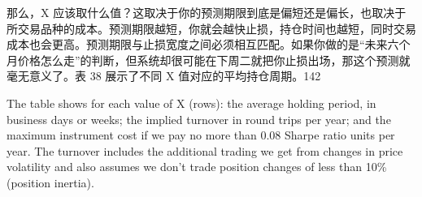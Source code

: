 \begin{chineseblock}那么，X 应该取什么值？这取决于你的预测期限到底是偏短还是偏长，也取决于所交易品种的成本。预测期限越短，你就会越快止损，持仓时间也越短，同时交易成本也会更高。预测期限与止损宽度之间必须相互匹配。如果你做的是“未来六个月价格怎么走”的判断，但系统却很可能在下周二就把你止损出场，那这个预测就毫无意义了。表 38 展示了不同 X 值对应的平均持仓周期。142 \end{chineseblock}

\begin{bilingualtableblock} 
\end{bilingualtableblock}

\begin{englishblock} The table shows for each value of X (rows): the average holding period, in business days or weeks; the implied turnover in round trips per year; and the maximum instrument cost if we pay no more than 0.08 Sharpe ratio units per year. The turnover includes the additional trading we get from changes in price volatility and also assumes we don't trade position changes of less than 10\% (position inertia). \end{englishblock}

